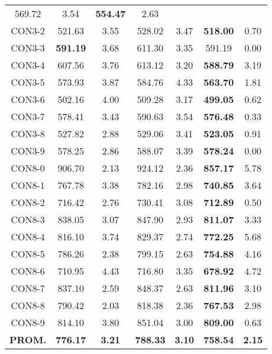 \begin{table}[ht]
\begin{tabular}{c c c c c c c}
569.72 & 3.54 & \bf{554.47} & 
2.63\\CON3-2 & 521.63 & 3.55 & 
528.02 & 3.47 & \bf{518.00} & 
0.70\\CON3-3 & \bf{591.19} & 3.68 & 
611.30 & 3.35 & 591.19 & 0.00\\
CON3-4 & 607.56 & 3.76 & 
613.12 & 3.20 & \bf{588.79} & 
3.19\\CON3-5 & 573.93 & 3.87 & 
584.76 & 4.33 & \bf{563.70} & 
1.81\\CON3-6 & 502.16 & 4.00 & 
509.28 & 3.17 & \bf{499.05} & 
0.62\\CON3-7 & 578.41 & 3.43 & 
590.63 & 3.54 & \bf{576.48} & 
0.33\\CON3-8 & 527.82 & 2.88 & 
529.06 & 3.41 & \bf{523.05} & 
0.91\\CON3-9 & 578.25 & 2.86 & 
588.07 & 3.39 & \bf{578.24} & 
0.00\\CON8-0 & 906.70 & 2.13 & 
924.12 & 2.36 & \bf{857.17} & 
5.78\\CON8-1 & 767.78 & 3.38 & 
782.16 & 2.98 & \bf{740.85} & 
3.64\\CON8-2 & 716.42 & 2.76 & 
730.41 & 3.08 & \bf{712.89} & 
0.50\\CON8-3 & 838.05 & 3.07 & 
847.90 & 2.93 & \bf{811.07} & 
3.33\\CON8-4 & 816.10 & 3.74 & 
829.37 & 2.74 & \bf{772.25} & 
5.68\\CON8-5 & 786.26 & 2.38 & 
799.15 & 2.63 & \bf{754.88} & 
4.16\\CON8-6 & 710.95 & 4.43 & 
716.80 & 3.35 & \bf{678.92} & 
4.72\\CON8-7 & 837.10 & 2.59 & 
848.37 & 2.63 & \bf{811.96} & 
3.10\\CON8-8 & 790.42 & 2.03 & 
818.38 & 2.36 & \bf{767.53} & 
2.98\\CON8-9 & 814.10 & 3.80 & 
851.04 & 3.00 & \bf{809.00} & 
0.63\\\bf{PROM.} & 
\bf{776.17} & \bf{3.21} & \bf{788.33} & \bf{3.10} & \bf{758.54} & \bf{2.15}\\[1ex]\hline
\end{tabular}
\label{table:nonlin}
\end{table} \clearpage
